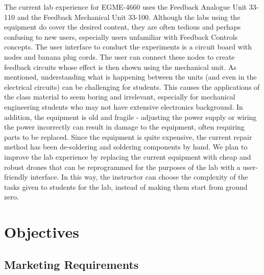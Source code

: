 \documentclass[12pt, titlepage]{article}
\begin{document}
The current lab experience for EGME-4660 uses the Feedback Analogue Unit 33-110 and the Feedback Mechanical Unit 33-100. Although the labs using the equipment do cover the desired content, they are often tedious and perhaps confusing to new users, especially users unfamiliar with Feedback Controls concepts. The user interface to conduct the experiments is a circuit board with nodes and banana plug cords. The user can connect these nodes to create feedback circuits whose effect is then shown using the mechanical unit. As mentioned, understanding what is happening between the units (and even in the electrical circuits) can be challenging for students. This causes the applications of the class material to  seem boring and irrelevant, especially for mechanical engineering students who may not have extensive electronics background. In addition, the equipment is old and fragile - adjusting the power supply or wiring the power incorrectly can result in damage to the equipment, often requiring parts to be replaced. Since the equipment is quite expensive, the current repair method has been de-soldering and soldering components by hand. We plan to improve the lab experience by replacing the current equipment with cheap and robust drones that can be reprogrammed for the purposes of the lab with a user-friendly interface. In this way, the instructor can choose the complexity of the tasks given to students for the lab, instead of making them start from ground zero.

\section{Objectives}
\subsection{Marketing Requirements}
\end{document}
